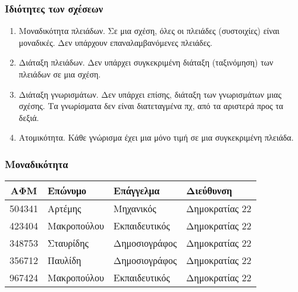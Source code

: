 \begin{frame}
\frametitle{Ιδιότητες των σχέσεων}
\begin{minipage}{\wE}
\pause
\begin{enumerate} [<+->] \itemsep 6pt
  \item {\cee Μοναδικότητα πλειάδων.} Σε μια σχέση, όλες οι πλειάδες (συστοιχίες) είναι μοναδικές.
        Δεν υπάρχουν επαναλαμβανόμενες πλειάδες.
  \item {\cee Διάταξη πλειάδων.} Δεν υπάρχει συγκεκριμένη διάταξη (ταξινόμηση) των πλειάδων σε μια σχέση.
  \item {\cee Διάταξη γνωρισμάτων.} Δεν υπάρχει επίσης, διάταξη των γνωρισμάτων μιας σχέσης.
        Τα γνωρίσματα δεν είναι διατεταγμένα πχ, από τα αριστερά προς τα δεξιά.
  \item {\cee Ατομικότητα.} Κάθε γνώρισμα έχει μια μόνο τιμή σε μια συγκεκριμένη πλειάδα.
\end{enumerate}
\end{minipage}
\end{frame}


\begin{frame}
\frametitle{Μοναδικότητα}
\begin{tabular}{ c l l l } \hline 
	{\bf ΑΦΜ} & {\bf Επώνυμο} & {\bf Επάγγελμα} & {\bf Διεύθυνση}\\ \hline 
	504341 & Αρτέμης     & Μηχανικός & Δημοκρατίας 22 \\ 
	423404 & Μακροπούλου & Εκπαιδευτικός & Δημοκρατίας 22   \\ 
	348753 & Σταυρίδης   & Δημοσιογράφος & Δημοκρατίας 22 \\ 
	356712 & Παυλίδη     & Δημοσιογράφος & Δημοκρατίας 22 \\ 
	967424 & Μακροπούλου & Εκπαιδευτικός & Δημοκρατίας 22   \\  \hline 
\end{tabular}
\end{frame}


